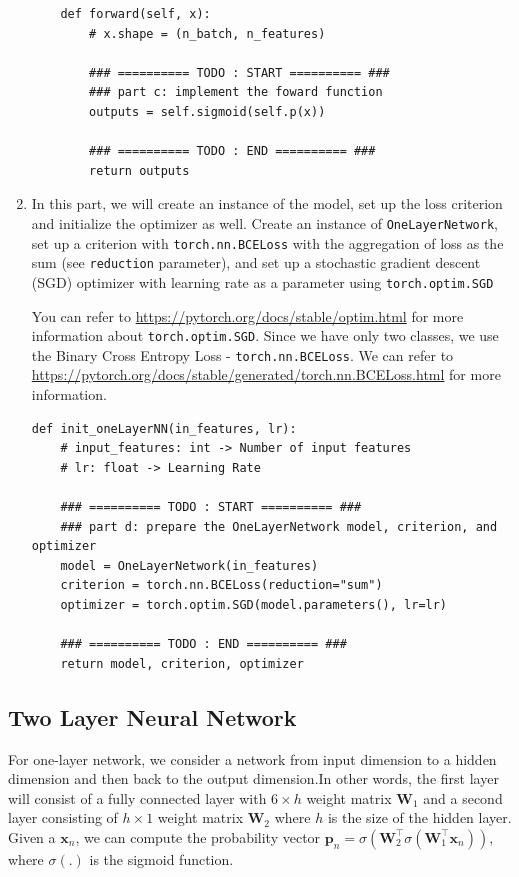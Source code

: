 \begin{enumerate}
\begin{verbatim}
    def forward(self, x):
        # x.shape = (n_batch, n_features)

        ### ========== TODO : START ========== ###
        ### part c: implement the foward function
        outputs = self.sigmoid(self.p(x))

        ### ========== TODO : END ========== ###
        return outputs
\end{verbatim}

\item {}
In this part, we will create an instance of the model, set up the loss criterion and initialize the optimizer as well. Create an instance of \verb|OneLayerNetwork|, set up a criterion with \verb|torch.nn.BCELoss| with the aggregation of loss as the sum (see \verb|reduction| parameter), and set up a stochastic gradient descent (SGD) optimizer with learning rate as a parameter using \verb|torch.optim.SGD| 

You can refer to \url{https://pytorch.org/docs/stable/optim.html} for more information about \verb|torch.optim.SGD|. Since we have only two classes, we use the Binary Cross Entropy Loss - \verb|torch.nn.BCELoss|. We can refer to \url{https://pytorch.org/docs/stable/generated/torch.nn.BCELoss.html} for more information.

\begin{verbatim}
def init_oneLayerNN(in_features, lr):
    # input_features: int -> Number of input features
    # lr: float -> Learning Rate

    ### ========== TODO : START ========== ###
    ### part d: prepare the OneLayerNetwork model, criterion, and optimizer
    model = OneLayerNetwork(in_features)
    criterion = torch.nn.BCELoss(reduction="sum")
    optimizer = torch.optim.SGD(model.parameters(), lr=lr)

    ### ========== TODO : END ========== ###
    return model, criterion, optimizer
\end{verbatim}

\end{enumerate}

\subsection{Two Layer Neural Network }

For one-layer network, we consider a network from input dimension to a hidden dimension and then back to the output dimension.In other words, the first layer will consist of a fully connected layer with $6 \times h$ weight matrix $\mathbf{W}_1$ and a second layer consisting of $h \times 1$ weight matrix $\mathbf{W}_2$ where $h$ is the size of the hidden layer. Given a $\mathbf{x}_n$, we can compute the probability vector $\mathbf{p}_n = \sigma(\mathbf{W}_2^\top \sigma(\mathbf{W}_1^\top \mathbf{x}_n))$, where $\sigma(.)$ is the sigmoid function.

